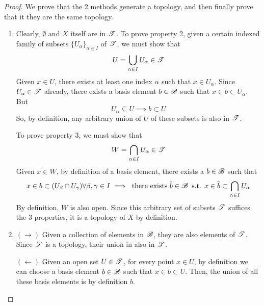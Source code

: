     \begin{proof}
      We prove that the 2 methods generate a topology, and then finally prove that it they are the same topology. 
      \begin{enumerate}
        \item Clearly, $\emptyset$ and $X$ itself are in $\T$. To prove property 2, given a certain indexed family of subsets $\{U_\alpha\}_{\alpha \in I}$ of $\T$, we must show that 
        \begin{equation}
          U = \bigcup_{\alpha \in I} U_\alpha \in \T
        \end{equation}
        Given $x \in U$, there exists at least one index $\alpha$ such that $x \in U_\alpha$. Since $U_\alpha \in \T$ already, there exists a basis element $b \in \B$ such that $x \in b \subset U_\alpha$. But 
        \begin{equation}
          U_\alpha \subseteq U \implies b \subset U
        \end{equation}
        So, by definition, any arbitrary union of $U$ of these subsets is also in $\T$. 

        To prove property 3, we must show that 
        \begin{equation}
          W = \bigcap_{\alpha \in I} U_\alpha \in \T
        \end{equation}
        Given $x \in W$, by definition of a basis element, there exists a $b \in \B$ such that 
        \begin{equation}
          x \in b \subset (U_\beta \cap U_\gamma) \forall \beta, \gamma \in I \implies \text{ there exists } \Tilde{b} \in \B \text{ s.t. } x \in \Tilde{b} \subset \bigcap_{\alpha \in I} U_\alpha
        \end{equation}
        By definition, $W$ is also open. Since this arbitrary set of subsets $\T$ suffices the 3 properties, it is a topology of $X$ by definition. 

        \item $(\rightarrow)$ Given a collection of elements in $\B$, they are also elements of $\T$. Since $\T$ is a topology, their union in also in $\T$. 

        $(\leftarrow)$ Given an open set $U \in \T$, for every point $x \in U$, by definition we can choose a basis element $b \in \B$ such that $x \in b \subset U$. Then, the union of all these basis elements is by definition $b$. 
          
      \end{enumerate}
    \end{proof}

